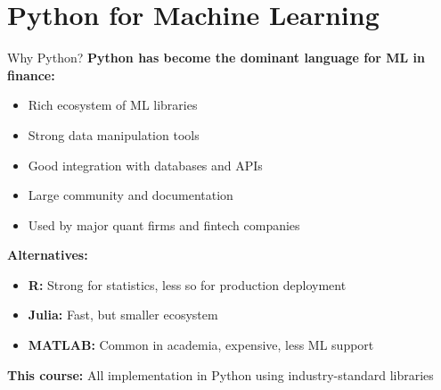 \documentclass[10pt]{beamer}
\begin{document}
\section{Python for Machine Learning}

\begin{frame}{Why Python?}
  \textbf{Python has become the dominant language for ML in finance:}
  
  \vspace{0.5em}
  \begin{itemize}
    \item Rich ecosystem of ML libraries
    \item Strong data manipulation tools
    \item Good integration with databases and APIs
    \item Large community and documentation
    \item Used by major quant firms and fintech companies
  \end{itemize}
  
  \vspace{1em}
  \textbf{Alternatives:}
  \begin{itemize}
    \item \textbf{R:} Strong for statistics, less so for production deployment
    \item \textbf{Julia:} Fast, but smaller ecosystem
    \item \textbf{MATLAB:} Common in academia, expensive, less ML support
  \end{itemize}
  
  \vspace{0.5em}
  \textbf{This course:} All implementation in Python using industry-standard libraries
\end{frame}
\end{document}
